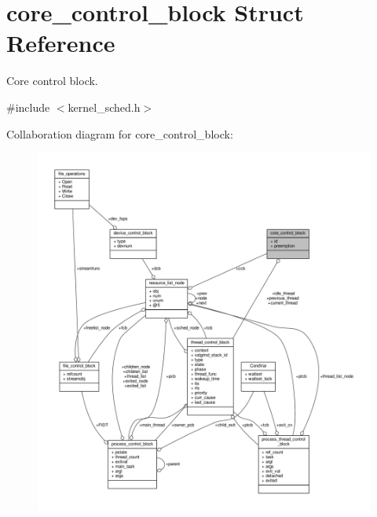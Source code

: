 \hypertarget{structcore__control__block}{}\section{core\+\_\+control\+\_\+block Struct Reference}
\label{structcore__control__block}


Core control block.  




{\ttfamily \#include $<$kernel\+\_\+sched.\+h$>$}



Collaboration diagram for core\+\_\+control\+\_\+block\+:\nopagebreak
\begin{figure}[H]
\begin{center}
\leavevmode
\includegraphics[width=350pt]{structcore__control__block__coll__graph}
\end{center}
\end{figure}

